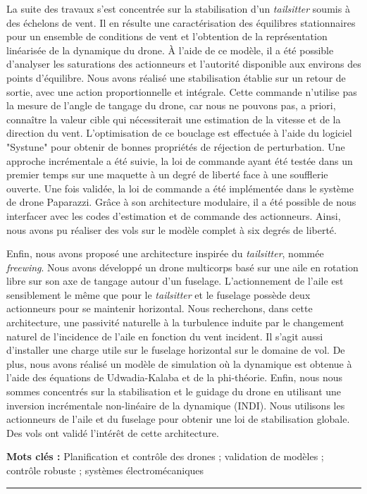 \begin{vcenterpage}
La suite des travaux s'est concentrée sur la stabilisation d'un \textit{tailsitter} soumis à des échelons de vent. Il en résulte une caractérisation des équilibres stationnaires pour un ensemble de conditions de vent et l'obtention de la représentation linéarisée de la dynamique du drone. À l'aide de ce modèle, il a été possible d'analyser les saturations des actionneurs et l'autorité disponible aux environs des points d'équilibre. Nous avons réalisé une stabilisation établie sur un retour de sortie, avec une action proportionnelle et intégrale. Cette commande n'utilise pas la mesure de l'angle de tangage du drone, car nous ne pouvons pas, a priori, connaître la valeur cible qui nécessiterait une estimation de la vitesse et de la direction du vent. L'optimisation de ce bouclage est effectuée à l'aide du logiciel "Systune" pour obtenir de bonnes propriétés de réjection de perturbation. Une approche incrémentale a été suivie, la loi de commande ayant été testée dans un premier temps sur une maquette à un degré de liberté face à une soufflerie ouverte. Une fois validée, la loi de commande a été implémentée dans le système de drone Paparazzi. Grâce à son architecture modulaire, il a été possible de nous interfacer avec les codes d'estimation et de commande des actionneurs. Ainsi, nous avons pu réaliser des vols sur le modèle complet à six degrés de liberté.

Enfin, nous avons proposé une architecture inspirée du \textit{tailsitter}, nommée \textit{freewing}. Nous avons développé un drone multicorps basé sur une aile en rotation libre sur son axe de tangage autour d'un fuselage. L'actionnement de l'aile est sensiblement le même que pour le \textit{tailsitter} et le fuselage possède deux actionneurs pour se maintenir horizontal. Nous recherchons, dans cette architecture, une passivité naturelle à la turbulence induite par le changement naturel de l'incidence de l'aile en fonction du vent incident. Il s'agit aussi d'installer une charge utile sur le fuselage horizontal sur le domaine de vol. De plus, nous avons réalisé un modèle de simulation où la dynamique est obtenue à l'aide des équations de Udwadia-Kalaba et de la phi-théorie. Enfin, nous nous sommes concentrés sur la stabilisation et le guidage du drone en utilisant une inversion incrémentale non-linéaire de la dynamique (INDI). Nous utilisons les actionneurs de l'aile et du fuselage pour obtenir une loi de stabilisation globale. Des vols ont validé l'intérêt de cette architecture.

{\large\textbf{Mots clés :}}
Planification et contrôle des drones ; validation de modèles ; contrôle robuste ; systèmes électromécaniques

\noindent\rule[2pt]{\textwidth}{0.5pt}
\end{vcenterpage}

